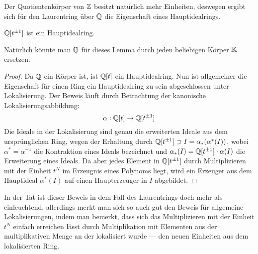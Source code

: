 Der Quotientenkörper von $\mathbb{Z}$ besitzt natürlich mehr Einheiten, deswegen ergibt sich für den Laurentring über $\mathbb{Q}$ die Eigenschaft eines Hauptidealrings.
\begin{lem}
\label{lem:QThauptidealring}
	$\mathbb{Q}[t^{\pm 1}]$ ist ein Hauptidealring.
\end{lem}
Natürlich könnte man $\mathbb{Q}$ für dieses Lemma durch jeden beliebigen Körper $\mathbb{K}$ ersetzen. 
\begin{proof}
	Da $\mathbb{Q}$ ein Körper ist, ist $\mathbb{Q}[t]$ ein Hauptidealring. Nun ist allgemeiner die Eigenschaft für einen Ring ein Hauptidealring zu sein abgeschlossen unter Lokalisierung. Der Beweis läuft durch Betrachtung der kanonische Lokalisierungsabbildung:
	\[
		\alpha : \mathbb{Q}[t] \to \mathbb{Q}[t^{\pm 1}]
	\]
	Die Ideale in der Lokalisierung sind genau die erweiterten Ideale aus dem ursprünglichen Ring, wegen der Erhaltung durch $\mathbb{Q}[t^{\pm 1}] \supset I=\alpha_*(\alpha^*(I))$, wobei $\alpha^* = \alpha^{-1}$ die Kontraktion eines Ideals bezeichnet und $\alpha_*(I) = \mathbb{Q}[t^{\pm 1}] \cdot \alpha(I)$ die Erweiterung eines Ideals. Da aber jedes Element in $\mathbb{Q}[t^{\pm 1}]$ durch Multiplizieren mit der Einheit $t^N$ im Erzeugnis eines Polynoms liegt, wird ein Erzeuger aus dem Hauptideal $\alpha^*(I)$ auf einen Haupterzeuger in $I$ abgebildet. 
\end{proof}
 In der Tat ist dieser Beweis in dem Fall des Laurentrings doch mehr als einleuchtend, allerdings merkt man sich so auch gut den Beweis für allgemeine Lokalisierungen, indem man bemerkt, dass sich das Multiplizieren mit der Einheit $t^N$ einfach erreichen lässt durch Multiplikation mit Elementen aus der multiplikativen Menge an der lokalisiert wurde --- den neuen Einheiten aus dem lokalisierten Ring.






